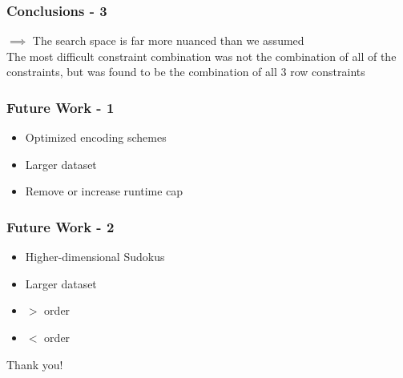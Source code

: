 \documentclass{beamer}
\begin{document}
\begin{frame}
\frametitle{Conclusions - 3}
$\implies$ {\Large The search space is far more nuanced than we assumed \\ The most difficult constraint combination was not the combination of all of the constraints, but was found to be the combination of all 3 row constraints}
\end{frame}


\begin{frame}
\frametitle{Future Work - 1}
\begin{itemize}
\item Optimized encoding schemes \pause
\item Larger dataset \pause
\item Remove or increase runtime cap
\end{itemize}
\end{frame}

\begin{frame}
	\frametitle{Future Work - 2}
	\begin{itemize}
		\item Higher-dimensional Sudokus \pause
		\item Larger dataset \pause
		\item $>$ order \pause
		\item $<$ order  
	\end{itemize}
\end{frame}

\begin{frame}[standout]
	Thank you!
\end{frame}

 
\end{document}
